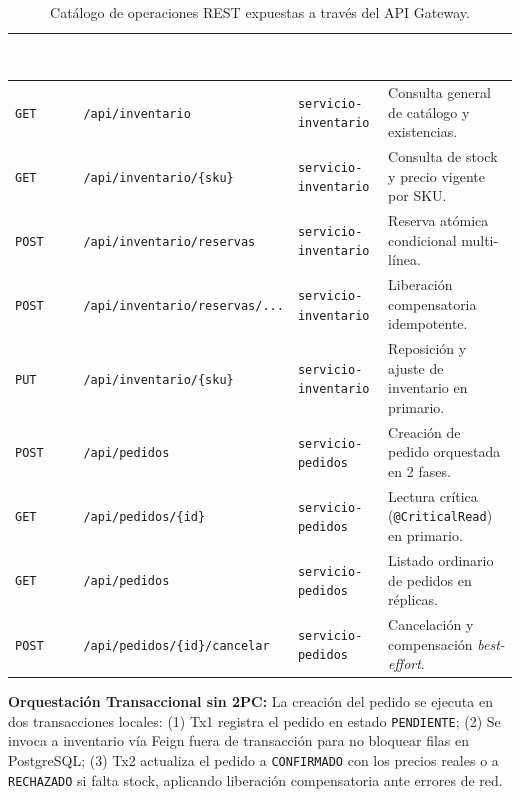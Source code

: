 \documentclass[12pt,a4paper]{article}
\begin{document}
\begin{table}[H]
\centering
\small
\begin{tabularx}{\textwidth}{@{}L{1.8cm}L{4.2cm}L{3.0cm}Y@{}}
\toprule[1.2pt]
\textcolor{white}{\textbf{M\'{e}todo}} & 
\textcolor{white}{\textbf{Ruta en Gateway (:8080)}} & 
\textcolor{white}{\textbf{Servicio Destino}} & 
\textcolor{white}{\textbf{Descripci\'{o}n y Sem\'{a}ntica}} \\
\midrule[0.8pt]
\texttt{GET} & \texttt{/api/inventario} & \texttt{servicio-inventario} & Consulta general de cat\'{a}logo y existencias. \\
\texttt{GET} & \texttt{/api/inventario/\{sku\}} & \texttt{servicio-inventario} & Consulta de stock y precio vigente por SKU. \\
\texttt{POST} & \texttt{/api/inventario/reservas} & \texttt{servicio-inventario} & Reserva at\'{o}mica condicional multi-l\'{i}nea. \\
\texttt{POST} & \texttt{/api/inventario/reservas/...} & \texttt{servicio-inventario} & Liberaci\'{o}n compensatoria idempotente. \\
\texttt{PUT} & \texttt{/api/inventario/\{sku\}} & \texttt{servicio-inventario} & Reposici\'{o}n y ajuste de inventario en primario. \\
\texttt{POST} & \texttt{/api/pedidos} & \texttt{servicio-pedidos} & Creaci\'{o}n de pedido orquestada en 2 fases. \\
\texttt{GET} & \texttt{/api/pedidos/\{id\}} & \texttt{servicio-pedidos} & Lectura cr\'{i}tica (\texttt{@CriticalRead}) en primario. \\
\texttt{GET} & \texttt{/api/pedidos} & \texttt{servicio-pedidos} & Listado ordinario de pedidos en r\'{e}plicas. \\
\texttt{POST} & \texttt{/api/pedidos/\{id\}/cancelar} & \texttt{servicio-pedidos} & Cancelaci\'{o}n y compensaci\'{o}n \textit{best-effort}. \\
\bottomrule[1.2pt]
\end{tabularx}
\caption{Cat\'{a}logo de operaciones REST expuestas a trav\'{e}s del API Gateway.}
\label{tab:endpoints}
\end{table}

\begin{tcolorbox}[formalbox]
\textbf{Orquestaci\'{o}n Transaccional sin 2PC:} La creaci\'{o}n del pedido se ejecuta en dos transacciones locales: 
(1) Tx1 registra el pedido en estado \texttt{PENDIENTE}; 
(2) Se invoca a inventario v\'{i}a Feign fuera de transacci\'{o}n para no bloquear filas en PostgreSQL; 
(3) Tx2 actualiza el pedido a \texttt{CONFIRMADO} con los precios reales o a \texttt{RECHAZADO} si falta stock, aplicando liberaci\'{o}n compensatoria ante errores de red.
\end{tcolorbox}
\end{document}
